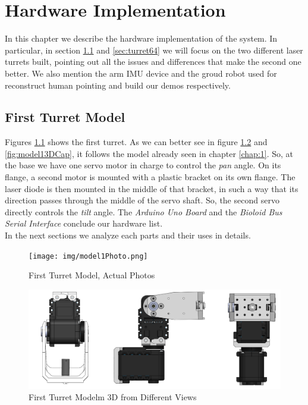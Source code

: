 \chapter{Hardware Implementation}
\label{chap:2}
In this chapter we describe the hardware implementation of the system. In particular, in section \ref{sec:turret12} and \ref{sec:turret64} we will focus on the two different laser turrets built, pointing out all the issues and differences that make the second one better. We also mention the arm IMU device and the groud robot used for reconstruct human pointing and build our demos respectively.
\section{First Turret Model} \label{sec:turret12}
Figures \ref{fig:model1Photo} shows the first turret. As we can better see in figure \ref{fig:model13D} and \ref{fig:model13DCap}, it follows the model already seen in chapter \ref{chap:1}. So, at the base we have one servo motor in charge to control the \emph{pan} angle. On its flange, a second motor is mounted with a plastic bracket on its own flange. The laser diode is then mounted in the middle of that bracket, in such a way that its direction passes through the middle of the servo shaft. So, the second servo directly controls the \emph{tilt} angle. 
The \emph{Arduino Uno Board} and the \emph{Bioloid Bus Serial Interface} conclude our hardware list.
\\In the next sections we analyze each parts and their uses in details.
\begin{figure}
	\centering
	\texttt{[image: img/model1Photo.png]}%
	\caption{First Turret Model, Actual Photos}
	\label{fig:model1Photo}
\end{figure}
\begin{figure}
	\centering
	\includegraphics[width=\textwidth]{img/model13dsides.png}%
	\caption{First Turret Modelm 3D from Different Views}
	\label{fig:model13D}
\end{figure}
